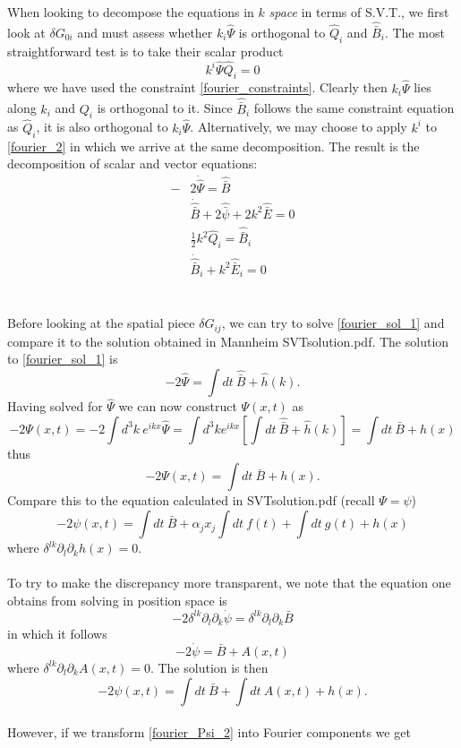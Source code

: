 \documentclass[10pt,letterpaper]{article}
\newcommand{\blr}[1]{\left[#1\right]} %
\newcommand{\be}{\begin{equation}} %
\newcommand{\ee}{\end{equation}} %
\newcommand{\pd}{\partial}
\numberwithin{equation}{section}
\begin{document}
When looking to decompose the equations in $k$ \emph{space} in terms of S.V.T., we first look at $\delta G_{0i}$ and must assess whether $k_i \hat \Psi$ is orthogonal to $\hat Q_i$ and $\hat{\bar B}_i$. The most straightforward test is to take their scalar product
\be
	k^i \hat \Psi \hat Q_i = 0
\ee
where we have used the constraint \ref{fourier_constraints}. Clearly then $k_i\hat \Psi$ lies along $k_i$ and $Q_i$ is orthogonal to it. Since $\hat{\bar B}_i$ follows the same constraint equation as $\hat Q_i$, it is also orthogonal to $k_i\hat\Psi$. Alternatively, we may choose to apply $k^i$ to \ref{fourier_2} in which we arrive at the same decomposition. The result is the decomposition of scalar and vector equations:
\begin{align}
-&2\dot{\hat\Psi} = \hat{\bar B}\label{fourier_sol_1}\\
&\dot{\hat{\bar B}} + 2\hat{\bar \psi} + 2k^2 \hat{\bar E} = 0\\
&\frac12 k^2 \hat{Q}_i = \hat{\bar B}_i\\
&\dot{\hat{\bar B}}_i + k^2\hat{\bar E}_i = 0
\end{align}
\\ \\
Before looking at the spatial piece $\delta G_{ij}$, we can try to solve \ref{fourier_sol_1} and compare it to the solution obtained in Mannheim SVTsolution.pdf. The solution to \ref{fourier_sol_1} is
\be
	-2\hat\Psi = \int dt\ \hat{\bar B} + \hat{h}(k).
\ee
Having solved for $\hat \Psi$ we can now construct $\Psi(x,t)$ as
\be
	-2\Psi(x,t) = -2\int d^3k\ e^{ikx}\hat\Psi
 = \int d^3k e^{ikx}\blr{ \int dt\ \hat{\bar B} + \hat{h}(k)}= \int dt\ \bar B + h(x)
\ee
thus
\be
	-2\Psi(x,t) =  \int dt\ \bar B + h(x).\label{fourier_Psi_1}
\ee
Compare this to the equation calculated in SVTsolution.pdf (recall $\Psi = \psi$)
\be
	-2\psi(x,t) = \int dt\ \bar B + \alpha_j x_j \int dt\ f(t) + \int dt\ g(t) + h(x)
\ee
where $ \delta^{lk}\pd_l\pd_k h(x) = 0$. 
\\ \\
To try to make the discrepancy more transparent, we note that the equation one obtains from solving in position space is
\be
	-2 \delta^{lk}\pd_l\pd_k \dot \psi =  \delta^{lk}\pd_l\pd_k \bar B\label{fourier_Psi_2}
\ee
in which it follows
\be
	-2\dot \psi = \bar B + A(x,t)
\ee
where $ \delta^{lk}\pd_l\pd_k A(x,t) = 0$. The solution is then
\be
	-2\psi(x,t) = \int dt\ \bar B + \int dt\  A(x,t) + h(x).
\ee
\\ 
However, if we transform \ref{fourier_Psi_2} into Fourier components we get
\end{document}
